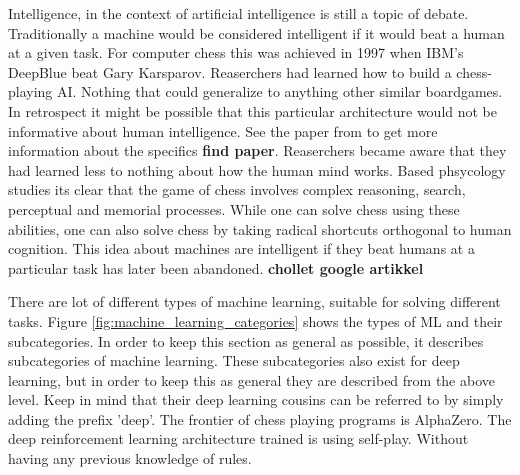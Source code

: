 \documentclass{article}
\begin{document}
Intelligence, in the context of artificial intelligence is still a topic of debate. Traditionally a machine would be considered intelligent if it would beat a human at a given task. For computer chess this was achieved in 1997 when IBM's DeepBlue beat Gary Karsparov. Reaserchers had learned how to build a chess-playing AI. Nothing that could generalize to anything other similar boardgames. In retrospect it might be possible that this particular architecture would not be informative about human intelligence. See the paper from to get more information about the specifics \textbf{find paper}. Reaserchers became aware that they had learned less to nothing about how the human mind works. Based phsycology studies its clear that the game of chess involves complex reasoning, search, perceptual and memorial processes. While one can solve chess using these abilities, one can also solve chess by taking radical shortcuts orthogonal to human cognition. This idea about machines are intelligent if they beat humans at a particular task has later been abandoned. \textbf{chollet google artikkel}

There are lot of different types of machine learning, suitable for solving different tasks. Figure \ref{fig:machine_learning_categories} shows the types of ML and their subcategories. In order to keep this section as general as possible, it describes subcategories of machine learning. These subcategories also exist for deep learning, but in order to keep this as general they are described from the above level. Keep in mind that their deep learning cousins can be referred to by simply adding the prefix 'deep'. The frontier of chess playing programs is AlphaZero. The deep reinforcement learning architecture trained is using self-play. Without having any previous knowledge of rules. 
 
\end{document}
